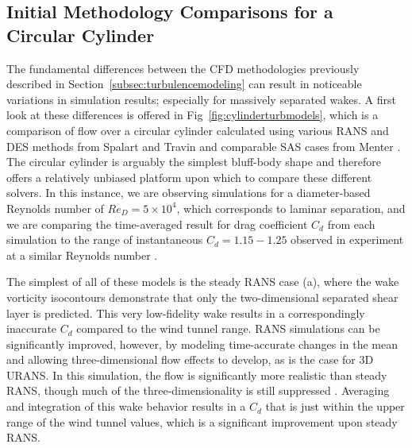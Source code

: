 \documentclass[journal]{new-aiaa}
\begin{document}
\subsection{Initial Methodology Comparisons for a Circular Cylinder} \label{subsec:initialcompare}

The fundamental differences between the CFD methodologies previously described in Section~\ref{subsec:turbulencemodeling} can result in noticeable variations in simulation results; especially for massively separated wakes. A first look at these differences is offered in Fig~\ref{fig:cylinderturbmodels}, which is a comparison of flow over a circular cylinder calculated using various RANS and DES methods from Spalart and Travin \cite{spalart2009detachededdy} and comparable SAS cases from Menter \cite{menter2005scaleadaptive}. The circular cylinder is arguably the simplest bluff-body shape and therefore offers a relatively unbiased platform upon which to compare these different solvers. In this instance, we are observing simulations for a diameter-based Reynolds number of $Re_D = 5 \times 10^4$, which corresponds to laminar separation, and we are comparing the time-averaged result for drag coefficient $C_d$ from each simulation to the range of instantaneous $C_d=1.15-1.25$ observed in experiment at a similar Reynolds number \cite{travin2000detachededdy}.


The simplest of all of these models is the steady RANS case (a), where the wake vorticity isocontours demonstrate that only the two-dimensional separated shear layer is predicted. This very low-fidelity wake results in a correspondingly inaccurate $C_d$ compared to the wind tunnel range. RANS simulations can be significantly improved, however, by modeling time-accurate changes in the mean and allowing three-dimensional flow effects to develop, as is the case for 3D URANS.  In this simulation, the flow is significantly more realistic than steady RANS, though much of the three-dimensionality is still suppressed \cite{spalart2009detachededdy}.  Averaging and integration of this wake behavior results in a $C_d$ that is just within the upper range of the wind tunnel values, which is a significant improvement upon steady RANS.
\end{document}
